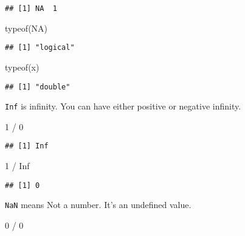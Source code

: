 \documentclass[
]{book}
\newenvironment{Shaded}{\begin{snugshade}}{\end{snugshade}}
\newcommand{\ConstantTok}[1]{\textcolor[rgb]{0.00,0.00,0.00}{#1}}
\newcommand{\DecValTok}[1]{\textcolor[rgb]{0.00,0.00,0.81}{#1}}
\newcommand{\FunctionTok}[1]{\textcolor[rgb]{0.00,0.00,0.00}{#1}}
\newcommand{\NormalTok}[1]{#1}
\newcommand{\SpecialCharTok}[1]{\textcolor[rgb]{0.00,0.00,0.00}{#1}}
\begin{document}
\begin{verbatim}
## [1] NA  1
\end{verbatim}

\begin{Shaded}
\begin{Highlighting}[]
\FunctionTok{typeof}\NormalTok{(}\ConstantTok{NA}\NormalTok{)}
\end{Highlighting}
\end{Shaded}

\begin{verbatim}
## [1] "logical"
\end{verbatim}

\begin{Shaded}
\begin{Highlighting}[]
\FunctionTok{typeof}\NormalTok{(x)}
\end{Highlighting}
\end{Shaded}

\begin{verbatim}
## [1] "double"
\end{verbatim}

\texttt{Inf} is infinity. You can have either positive or negative infinity.

\begin{Shaded}
\begin{Highlighting}[]
\DecValTok{1} \SpecialCharTok{/} \DecValTok{0}
\end{Highlighting}
\end{Shaded}

\begin{verbatim}
## [1] Inf
\end{verbatim}

\begin{Shaded}
\begin{Highlighting}[]
\DecValTok{1} \SpecialCharTok{/} \ConstantTok{Inf}
\end{Highlighting}
\end{Shaded}

\begin{verbatim}
## [1] 0
\end{verbatim}

\texttt{NaN} means Not a number. It's an undefined value.

\begin{Shaded}
\begin{Highlighting}[]
\DecValTok{0} \SpecialCharTok{/} \DecValTok{0}
\end{Highlighting}
\end{Shaded}
\end{document}
